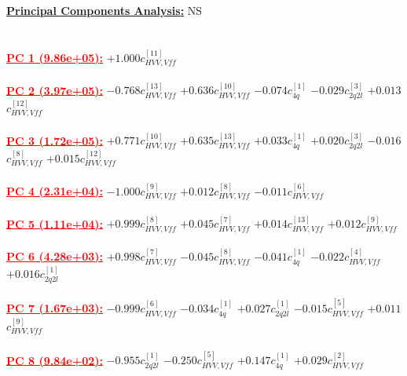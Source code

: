 \documentclass{article}
\begin{document}
\noindent \underline{\bf{Principal Components Analysis}:} NS\\ \\ \\
\noindent \textcolor{red}{\underline{\bf{PC 1} (9.86e+05):}}
{$+1.000$}{\rm $c_{HVV,Vff}^{[11]}$} 
 \nonumber \\ \nonumber \\ 
\noindent \textcolor{red}{\underline{\bf{PC 2} (3.97e+05):}}
{$-0.768$}{\rm $c_{HVV,Vff}^{[13]}$} 
{$+0.636$}{\rm $c_{HVV,Vff}^{[10]}$} 
{$-0.074$}{\rm $c_{4q}^{[1]}$} 
{$-0.029$}{\rm $c_{2q2l}^{[3]}$} 
{$+0.013$}{\rm $c_{HVV,Vff}^{[12]}$} 
 \nonumber \\ \nonumber \\ 
\noindent \textcolor{red}{\underline{\bf{PC 3} (1.72e+05):}}
{$+0.771$}{\rm $c_{HVV,Vff}^{[10]}$} 
{$+0.635$}{\rm $c_{HVV,Vff}^{[13]}$} 
{$+0.033$}{\rm $c_{4q}^{[1]}$} 
{$+0.020$}{\rm $c_{2q2l}^{[3]}$} 
{$-0.016$}{\rm $c_{HVV,Vff}^{[8]}$} 
{$+0.015$}{\rm $c_{HVV,Vff}^{[12]}$} 
 \nonumber \\ \nonumber \\ 
\noindent \textcolor{red}{\underline{\bf{PC 4} (2.31e+04):}}
{$-1.000$}{\rm $c_{HVV,Vff}^{[9]}$} 
{$+0.012$}{\rm $c_{HVV,Vff}^{[8]}$} 
{$-0.011$}{\rm $c_{HVV,Vff}^{[6]}$} 
 \nonumber \\ \nonumber \\ 
\noindent \textcolor{red}{\underline{\bf{PC 5} (1.11e+04):}}
{$+0.999$}{\rm $c_{HVV,Vff}^{[8]}$} 
{$+0.045$}{\rm $c_{HVV,Vff}^{[7]}$} 
{$+0.014$}{\rm $c_{HVV,Vff}^{[13]}$} 
{$+0.012$}{\rm $c_{HVV,Vff}^{[9]}$} 
 \nonumber \\ \nonumber \\ 
\noindent \textcolor{red}{\underline{\bf{PC 6} (4.28e+03):}}
{$+0.998$}{\rm $c_{HVV,Vff}^{[7]}$} 
{$-0.045$}{\rm $c_{HVV,Vff}^{[8]}$} 
{$-0.041$}{\rm $c_{4q}^{[1]}$} 
{$-0.022$}{\rm $c_{HVV,Vff}^{[4]}$} 
{$+0.016$}{\rm $c_{2q2l}^{[1]}$} 
 \nonumber \\ \nonumber \\ 
\noindent \textcolor{red}{\underline{\bf{PC 7} (1.67e+03):}}
{$-0.999$}{\rm $c_{HVV,Vff}^{[6]}$} 
{$-0.034$}{\rm $c_{4q}^{[1]}$} 
{$+0.027$}{\rm $c_{2q2l}^{[1]}$} 
{$-0.015$}{\rm $c_{HVV,Vff}^{[5]}$} 
{$+0.011$}{\rm $c_{HVV,Vff}^{[9]}$} 
 \nonumber \\ \nonumber \\ 
\noindent \textcolor{red}{\underline{\bf{PC 8} (9.84e+02):}}
{$-0.955$}{\rm $c_{2q2l}^{[1]}$} 
{$-0.250$}{\rm $c_{HVV,Vff}^{[5]}$} 
{$+0.147$}{\rm $c_{4q}^{[1]}$} 
{$+0.029$}{\rm $c_{HVV,Vff}^{[2]}$} 
\end{document}
